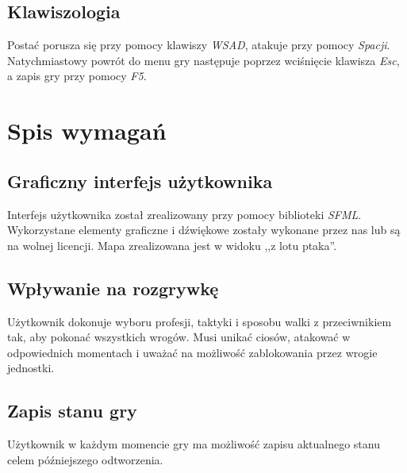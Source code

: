 \documentclass[10pt,a4paper]{article}
\begin{document}
\subsection{Klawiszologia}
Postać porusza się przy pomocy klawiszy \textit{WSAD}, atakuje przy pomocy \textit{Spacji}. Natychmiastowy powrót do menu gry następuje poprzez wciśnięcie klawisza \textit{Esc}, a zapis gry przy pomocy \textit{F5}.

\section{Spis wymagań}
\subsection{Graficzny interfejs użytkownika}
Interfejs użytkownika został zrealizowany przy pomocy biblioteki \textit{SFML}. Wykorzystane elementy graficzne i dźwiękowe zostały wykonane przez nas lub są na wolnej licencji. Mapa zrealizowana jest w widoku ,,z lotu ptaka''.

\subsection{Wpływanie na rozgrywkę}
Użytkownik dokonuje wyboru profesji, taktyki i sposobu walki z przeciwnikiem tak, aby pokonać wszystkich wrogów. Musi unikać ciosów, atakować w odpowiednich momentach i uważać na możliwość zablokowania przez wrogie jednostki.

\subsection{Zapis stanu gry}
Użytkownik w każdym momencie gry ma możliwość zapisu aktualnego stanu celem późniejszego odtworzenia.
\end{document}

